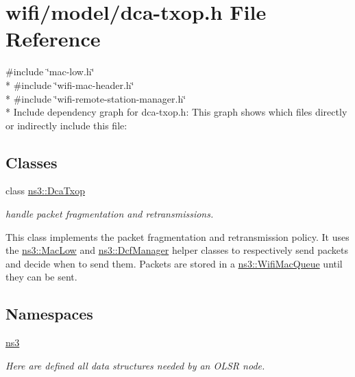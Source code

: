\hypertarget{dca-txop_8h}{}\section{wifi/model/dca-\/txop.h File Reference}
\label{dca-txop_8h}
{\ttfamily \#include \char`\"{}mac-\/low.\+h\char`\"{}}\\*
{\ttfamily \#include \char`\"{}wifi-\/mac-\/header.\+h\char`\"{}}\\*
{\ttfamily \#include \char`\"{}wifi-\/remote-\/station-\/manager.\+h\char`\"{}}\\*
Include dependency graph for dca-\/txop.h\+:
This graph shows which files directly or indirectly include this file\+:
\subsection*{Classes}
\begin{DoxyCompactItemize}
\item 
class \hyperlink{classns3_1_1DcaTxop}{ns3\+::\+Dca\+Txop}
\begin{DoxyCompactList}\small\item\em handle packet fragmentation and retransmissions.

This class implements the packet fragmentation and retransmission policy. It uses the \hyperlink{classns3_1_1MacLow}{ns3\+::\+Mac\+Low} and \hyperlink{classns3_1_1DcfManager}{ns3\+::\+Dcf\+Manager} helper classes to respectively send packets and decide when to send them. Packets are stored in a \hyperlink{namespacens3_a3ca96bcdf02c0e7cacea08ca62ead54c}{ns3\+::\+Wifi\+Mac\+Queue} until they can be sent. \end{DoxyCompactList}\end{DoxyCompactItemize}
\subsection*{Namespaces}
\begin{DoxyCompactItemize}
\item 
 \hyperlink{namespacens3}{ns3}
\begin{DoxyCompactList}\small\item\em Here are defined all data structures needed by an O\+L\+SR node. \end{DoxyCompactList}\end{DoxyCompactItemize}
